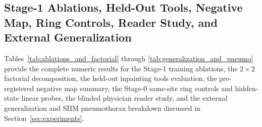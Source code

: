 \documentclass[5p,times,twocolumn,authoryear]{elsarticle}
\begin{document}
\subsection{Stage-1 Ablations, Held-Out Tools, Negative Map, Ring Controls, Reader Study, and External Generalization}
Tables~\ref{tab:ablations_and_factorial} through \ref{tab:generalization_and_pneumo} provide the complete numeric results for the Stage-1 training ablations, the $2\times 2$ factorial decomposition, the held-out inpainting tools evaluation, the pre-registered negative map summary, the Stage-0 same-site ring controls and hidden-state linear probes, the blinded physician reader study, and the external generalization and SIIM pneumothorax breakdown discussed in Section~\ref{sec:experiments}.

\begin{table}[!htbp]
\caption{Stage-1 counterfactual training ablations ($507$ main-test cases; 3-seed arms reported as $\text{mean} \pm \text{sd}$) and the $2\times 2$ factorial ablation of training-only components (Stage 1, seed 0) evaluating false denial of intact lesions when unseen TELEA edits occur elsewhere on the image ($125$ cases).}
\label{tab:ablations_and_factorial}
\begin{center}
\small
{}


\end{center}
\end{table}
\end{document}
